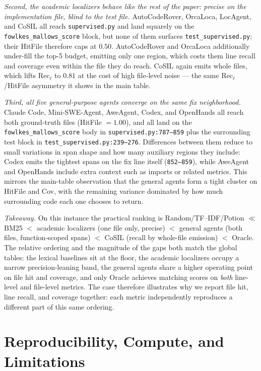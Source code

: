 \documentclass{llmxive}
\begin{document}
\emph{Second, the academic localizers behave like the rest of the paper: precise on the implementation file, blind to the test file.}
AutoCodeRover, OrcaLoca, LocAgent, and CoSIL all reach \texttt{supervised.py} and land squarely on the \texttt{fowlkes\_mallows\_score} block, but none of them surfaces \texttt{test\_supervised.py}; their HitFile therefore caps at $0.50$. AutoCodeRover and OrcaLoca additionally under-fill the top-5 budget, emitting only one region, which costs them line recall and coverage even within the file they do reach. CoSIL again emits whole files, which lifts Rec$_\ell$ to $0.81$ at the cost of high file-level noise --- the same Rec$_\ell$/HitFile asymmetry it shows in the main table.

\emph{Third, all five general-purpose agents converge on the same fix neighborhood.}
Claude Code, Mini-SWE-Agent, AweAgent, Codex, and OpenHands all reach both ground-truth files (HitFile $=1.00$), and all land on the \texttt{fowlkes\_mallows\_score} body in \texttt{supervised.py:787--859} plus the surrounding test block in \texttt{test\_supervised.py:239--276}. Differences between them reduce to small variations in span shape and how many auxiliary regions they include: Codex emits the tightest spans on the fix line itself (\texttt{852--859}), while AweAgent and OpenHands include extra context such as imports or related metrics. This mirrors the main-table observation that the general agents form a tight cluster on HitFile and Cov, with the remaining variance dominated by how much surrounding code each one chooses to return.

\emph{Takeaway.}
On this instance the practical ranking is Random/TF--IDF/Potion $\ll$ BM25 $<$ academic localizers (one file only, precise) $<$ general agents (both files, function-scoped spans) $<$ CoSIL (recall by whole-file emission) $<$ Oracle. The relative ordering and the magnitude of the gaps both match the global tables: the lexical baselines sit at the floor, the academic localizers occupy a narrow precision-leaning band, the general agents share a higher operating point on file hit and coverage, and only Oracle achieves matching scores on \emph{both} line-level and file-level metrics. The case therefore illustrates why we report file hit, line recall, and coverage together: each metric independently reproduces a different part of this same ordering.



\section{Reproducibility, Compute, and Limitations}
\label{app:reproducibility}
\end{document}
